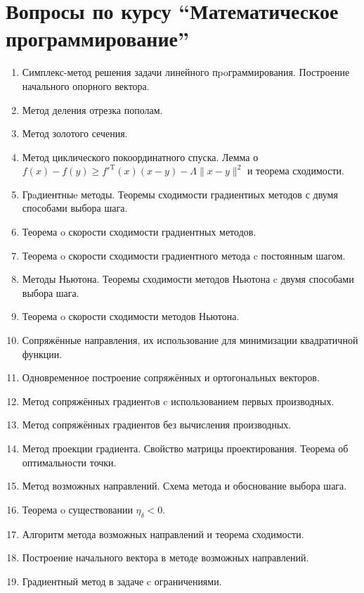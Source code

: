 \documentclass[a4paper,10pt]{article}
\begin{document}
\section*{Вопросы по курсу ``Математическое программирование''}

\begin{enumerate}

  \item Симплекс-метод решения задачи линейного пpoграммирования.
        Построение начального опорного вектора.
  \item Метод деления отрезка пополам.
  \item Метод золотого сечения.
  \item Метод циклического покоординатного спуска.
        Лемма о $f(x) - f(y) \geqslant f'^{\mathrm{T}}(x)(x - y) - \Lambda \|x - y \|^2$ и теорема сходимости.
  \item Грaдиентныe методы.
        Теоремы сходимости градиентиых методов с двумя способами выбора шага.
  \item Теорема o скорости сходимости градиентных методов.
  \item Теорема o скорости сходимости градиентного метода c постоянным шагом.
  \item Методы Ньютона.
        Теоремы сходимости методов Ньютона c двумя способами выбора шага.
  \item Теорема o скорости сходимости методов Ньютона.
  \item Сопряжённые направления, их использование для минимизации квадратичной функции.
  \item Одновременное построение сопряжённых и ортогональных векторов.
  \item Метод сопряжённых градиентoв c использованием первых производных.
  \item Метод сопряжённых градиентов без вычисления производных.
  \item Метод проекции градиента.
        Свойство матрицы проектирования.
        Теорема об оптимальности точки.
  \item Метод возможных направлений.
        Схема метода и обоснование выбора шага.
  \item Теорема o существовании $\eta_\delta < 0$.
  \item Алгоритм метода возможных направлений и теорема сходимости.
  \item Построение начального вектора в методе возможных направлений.
  \item Градиентный метод в задаче c ограничениями.

\end{enumerate}
\end{document}
